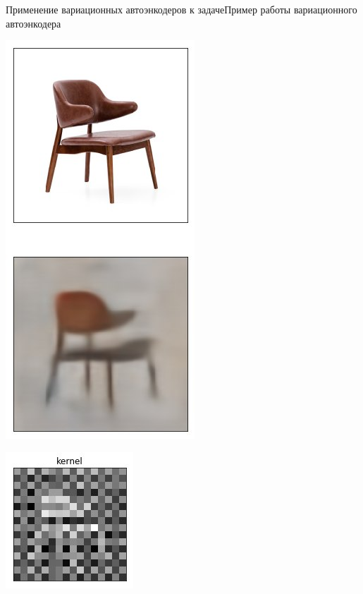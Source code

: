 \documentclass{beamer}
\begin{document}
\begin{frame}{Применение вариационных автоэнкодеров к задаче}{Пример работы вариационного автоэнкодера}

\begin{minipage}{0.3\textwidth}
	\begin{flushleft}
		\includegraphics[scale=0.37]{stul}
	\end{flushleft}
\end{minipage}
\hfill
\begin{minipage}{0.5\textwidth}
	\begin{flushleft}
		\includegraphics[scale=0.7]{stul_kernel}
	\end{flushleft}
\end{minipage}

\end{frame}
\end{document}
